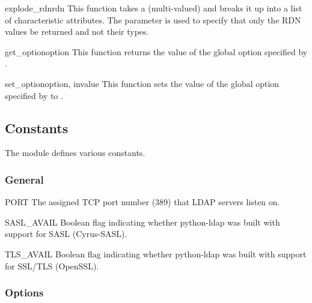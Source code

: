 \begin{funcdesc}{explode_rdn}{rdn } %
  This function takes a (multi-valued)  and breaks it up
  into a list of characteristic attributes. The
   parameter is used to specify that only the RDN values be 
  returned and not their types.
\end{funcdesc}

\begin{funcdesc}{get_option}{option} %
  This function returns the value of the global option
  specified by .
\end{funcdesc}

\begin{funcdesc}{set_option}{option, invalue} %
  This function sets the value of the global option
  specified by  to .
\end{funcdesc}



\subsection{Constants}

The module defines various constants.

\subsubsection{General}

\begin{datadesc}{PORT}
  The assigned TCP port number (389) that LDAP servers listen on.
\end{datadesc}

\begin{datadesc}{SASL_AVAIL}
  Boolean flag indicating whether python-ldap was built
  with support for SASL (Cyrus-SASL).
\end{datadesc}

\begin{datadesc}{TLS_AVAIL}
  Boolean flag indicating whether python-ldap was built
  with support for SSL/TLS (OpenSSL).
\end{datadesc}

\subsubsection{Options}

